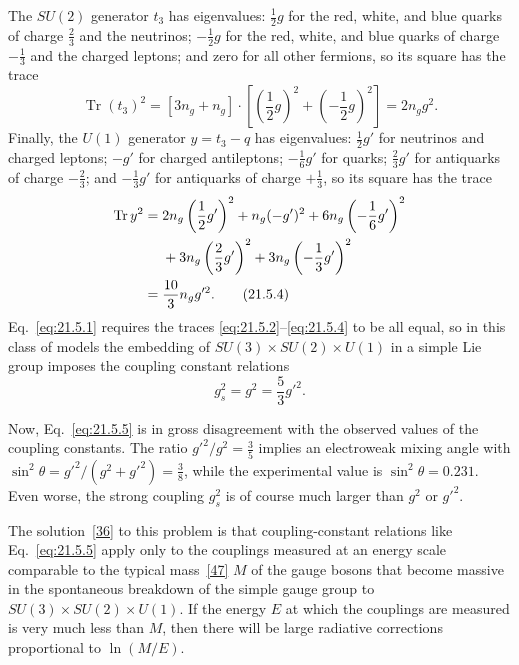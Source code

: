 The $SU(2)$ generator $t_3$ has eigenvalues: $\frac{1}{2}g$ for the red, white, and blue quarks of charge $\frac{2}{3}$ and the neutrinos; $-\frac{1}{2}g$ for the red, white, and blue quarks of charge $-\frac{1}{3}$ and the charged leptons; and zero for all other fermions, so its square has the trace
\begin{equation}
\operatorname{Tr}(t_3)^2
=[3n_g+n_g]\cdot\left[
\left(\frac{1}{2}g\right)^2
+\left(-\frac{1}{2}g\right)^2
\right]
=2n_gg^2.
\tag{21.5.3}\label{eq:21.5.3}
\end{equation}
Finally, the $U(1)$ generator $y=t_3-q$ has eigenvalues: $\frac{1}{2}g'$ for neutrinos and charged leptons; $-g'$ for charged antileptons; $-\frac{1}{6}g'$ for quarks; $\frac{2}{3}g'$ for antiquarks of charge $-\frac{2}{3}$; and $-\frac{1}{3}g'$ for antiquarks of charge $+\frac{1}{3}$, so its square has the trace
\begin{align}
\operatorname{Tr}y^2
={}&2n_g\left(\frac{1}{2}g'\right)^2
+n_g(-g')^2
+6n_g\left(-\frac{1}{6}g'\right)^2
\notag\\
&+3n_g\left(\frac{2}{3}g'\right)^2
+3n_g\left(-\frac{1}{3}g'\right)^2
\notag\\
={}&\frac{10}{3}n_gg'^2.
\tag{21.5.4}\label{eq:21.5.4}
\end{align}
Eq.~\eqref{eq:21.5.1} requires the traces \eqref{eq:21.5.2}--\eqref{eq:21.5.4} to be all equal, so in this class of models the embedding of $SU(3)\times SU(2)\times U(1)$ in a simple Lie group imposes the coupling constant relations
\begin{equation}
g_s^2=g^2=\frac{5}{3}g'^2.
\tag{21.5.5}\label{eq:21.5.5}
\end{equation}

Now, Eq.~\eqref{eq:21.5.5} is in gross disagreement with the observed values of the coupling constants. The ratio $g'^2/g^2=\frac{3}{5}$ implies an electroweak mixing angle with $\sin^2\theta=g'^2/(g^2+g'^2)=\frac{3}{8}$, while the experimental value is $\sin^2\theta=0.231$. Even worse, the strong coupling $g_s^2$ is of course much larger than $g^2$ or $g'^2$.

The solution~\hyperref[ch21-ref-36]{[36]} to this problem is that coupling-constant relations like Eq.~\eqref{eq:21.5.5} apply only to the couplings measured at an energy scale comparable to the typical mass~\hyperref[ch21-ref-47]{[47]} $M$ of the gauge bosons that become massive in the spontaneous breakdown of the simple gauge group to $SU(3)\times SU(2)\times U(1)$. If the energy $E$ at which the couplings are measured is very much less than $M$, then there will be large radiative corrections proportional to $\ln(M/E)$.

